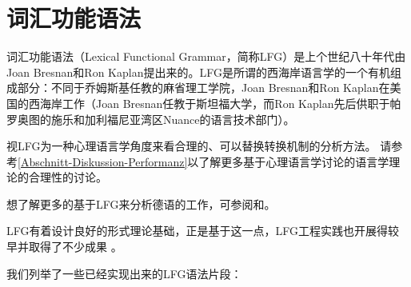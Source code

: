 
\chapter{词汇功能语法}
\label{Kapitel-LFG}

词汇功能语法（Lexical Functional Grammar，简称LFG）是上个世纪八十年代由Joan Bresnan和Ron Kaplan提出来的\citep{BK82a}。LFG是所谓的西海岸语言学的一个有机组成部分：不同于乔姆斯基任教的麻省理工学院，Joan Bresnan和Ron Kaplan在美国的西海岸工作（Joan Bresnan任教于斯坦福大学，而Ron Kaplan先后供职于帕罗奥图的施乐和加利福尼亚湾区Nuance的语言技术部门）。

\citet{BK82a}视LFG为一种心理语言学角度来看合理的、可以替换转换机制的分析方法。
请参考\ref{Abschnitt-Diskussion-Performanz}以了解更多基于心理语言学讨论的语言学理论的合理性的讨论。 

想了解更多的基于LFG来分析德语的工作，可参阅和。

LFG有着设计良好的形式理论基础\citep{KB82a-u,Kaplan95a}，正是基于这一点，LFG工程实践也开展得较早并取得了不少成果
\citep*{FR83b,FR83a,Yasukawa1984a-u,BH86a-u,%
ED86a-u,%
WA86a-u,%
Delmonte90a-u,%
HHP91a-u,%
Kohl92a-u,KGPRM92a-u,%
KM96a-u,%
Mayo97a-u,Mayo99a-u,%
BS2005b-u,BSagot2005a-u,%
Clement2009a-u,CK2001a-u%
}。

我们列举了一些已经实现出来的LFG语法片段：

